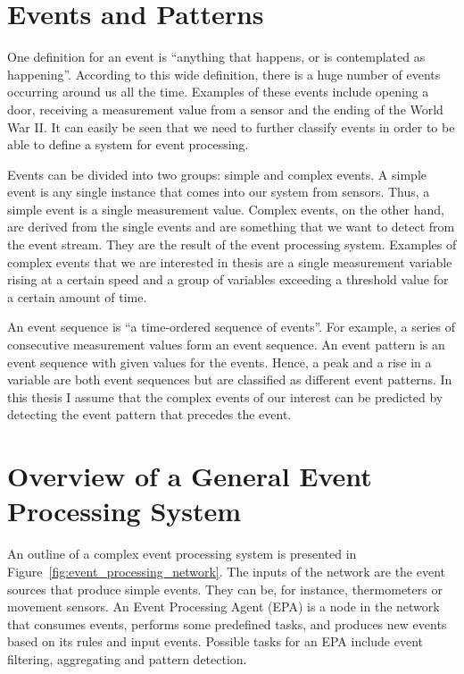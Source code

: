 \section{Events and Patterns}
One definition for an event is ``anything that happens, or is contemplated as happening''. \cite{Luckham08} According to this wide definition, there is a huge number of events occurring around us all the time. Examples of these events include opening a door, receiving a measurement value from a sensor and the ending of the World War II. It can easily be seen that we need to further classify events in order to be able to define a system for event processing.

Events can be divided into two groups: simple and complex events. \cite{IBM10} A simple event is any single instance that comes into our system from sensors. Thus, a simple event is a single measurement value. Complex events, on the other hand, are derived from the single events and are something that we want to detect from the event stream. They are the result of the event processing system. Examples of complex events that we are interested in thesis are a single measurement variable rising at a certain speed and a group of variables exceeding a threshold value for a certain amount of time.

An event sequence is ``a time-ordered sequence of events''. \cite{Weiss98} For example, a series of consecutive measurement values form an event sequence. An event pattern is an event sequence with given values for the events. \cite{Luckham08} Hence, a peak and a rise in a variable are both event sequences but are classified as different event patterns. In this thesis I assume that the complex events of our interest can be predicted by detecting the event pattern that precedes the event. 



\section{Overview of a General Event Processing System}
An outline of a complex event processing system is presented in Figure~\ref{fig:event_processing_network}. The inputs of the network are the event sources that produce simple events. They can be, for instance, thermometers or movement sensors. An Event Processing Agent (EPA) is a node in the network that consumes events, performs some predefined tasks, and produces new events based on its rules and input events. Possible tasks for an EPA include event filtering, aggregating and pattern detection. \cite{Fulop12}

